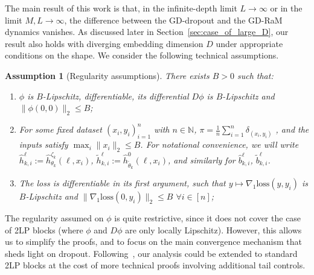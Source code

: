 \documentclass[a4paper,11pt]{article}
\newcommand{\1}{\mathbbm{1}}
\newtheorem{assumption}{Assumption}
\theoremstyle{definition}
\theoremstyle{remark}
\begin{document}
The main result of this work is that, in the infinite-depth limit $L\to \infty$ or in the limit $M,L\to \infty$, the difference between the GD-dropout and the GD-RaM dynamics vanishes. As discussed later in Section~\ref{sec:case_of_large_D}, our result also holds with diverging embedding dimension $D$ under appropriate conditions on the shape. We consider the following technical assumptions.
\begin{assumption}[Regularity assumptions]\label{ass:regularity_assumptions}
    There exists $B > 0$ such that:
\begin{enumerate}
    \item $\phi$ is $B$-Lipschitz, differentiable, its differential $D\phi$ is $B$-Lipschitz and $\|\phi(0,0)\|_2 \le B$;
    \item For some fixed dataset ${(x_i, y_i)}_{i=1}^n$ with $n\in \mathbb{N}$, $\pi = \frac{1}{n}\sum_{i=1}^n \delta_{(x_i, y_i)}$ , and the inputs satisfy $\max_i \|x_i\|_2 \le B$. For notational convenience, we will write \(\hat{h}_{k,i}^\ell := \hat{h}_{\theta_k}^{\zeta_k}(\ell, x_i)\), \(\tilde{h}_{k,i}^\ell := \hat{h}_{\tilde{\theta}_k}^{0}(\ell, x_i)\), and similarly for \(\hat{b}_{k,i}^\ell\), \(\tilde{b}_{k,i}^\ell\).
    \item The loss is differentiable in its first argument, such that $y\mapsto \nabla_1 \mathrm{loss}(y, y_i)$ is $B$-Lipschitz and $\|\nabla_1 \mathrm{loss}(0, y_i)\|_2 \le B$ $\forall i \in [n]$;
\end{enumerate}
\end{assumption}
The regularity assumed on $\phi$ is quite restrictive, since it does not cover the case of 2LP blocks (where $\phi$ and $D\phi$ are only locally Lipschitz). However, this allows us to simplify the proofs, and to focus on the main convergence mechanism that sheds light on dropout. Following~\cite[Section 4]{chizat2025hidden}, our analysis could be extended to standard 2LP blocks at the cost of more technical proofs involving additional tail controls.
\end{document}
